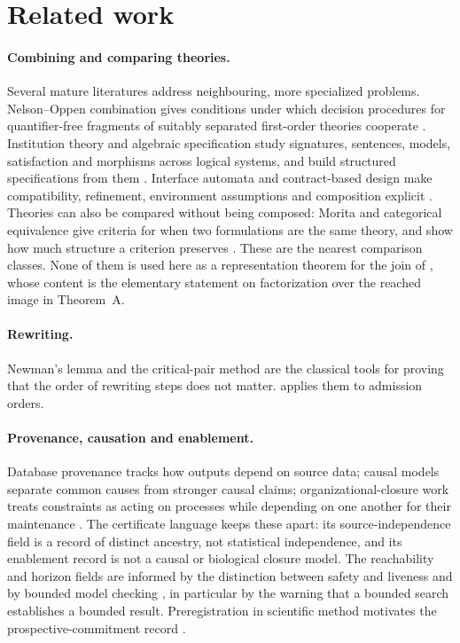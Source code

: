 \section{Related work}
\label{sec:related}

\paragraph{Combining and comparing theories.}
Several mature literatures address neighbouring, more specialized problems. Nelson--Oppen
combination gives conditions under which decision procedures for quantifier-free
fragments of suitably separated first-order theories cooperate \citep{NelsonOppen1979}.
Institution theory and algebraic specification study signatures, sentences, models,
satisfaction and morphisms across logical systems, and build structured specifications
from them \citep{GoguenBurstall1992,SannellaTarlecki2012}. Interface automata and
contract-based design make compatibility, refinement, environment assumptions and
composition explicit \citep{DeAlfaroHenzinger2001,AbadiLamport1993,BenvenisteEtAl2018}.
Theories can also be compared without being composed: Morita and categorical equivalence
give criteria for when two formulations are the same theory, and show how much structure
a criterion preserves \citep{BarrettHalvorson2016,Weatherall2021}. These are the nearest
comparison classes. None of them is used here as a representation theorem for the join
of , whose content is the elementary statement on factorization over the reached image in
Theorem~A.

\paragraph{Rewriting.}
Newman's lemma \citep{Newman1942} and the critical-pair method \citep{KnuthBendix1970,
Huet1980} are the classical tools for proving that the order of rewriting steps does not
matter.  applies them to admission orders.

\paragraph{Provenance, causation and enablement.}
Database provenance tracks how outputs depend on source data; causal models separate
common causes from stronger causal claims; organizational-closure work treats constraints
as acting on processes while depending on one another for their maintenance
\citep{GreenEtAl2007,Pearl2009,MontevilMossio2015}. The certificate language keeps these
apart: its source-independence field is a record of distinct ancestry, not statistical
independence, and its enablement record is not a causal or biological closure model. The
reachability and horizon fields are informed by the distinction between safety and
liveness and by bounded model checking \citep{AlpernSchneider1985,ClarkeEtAl2018,
BiereEtAl1999}, in particular by the warning that a bounded search establishes a bounded
result. Preregistration in scientific method motivates the prospective-commitment record
\citep{NosekEtAl2018}.

